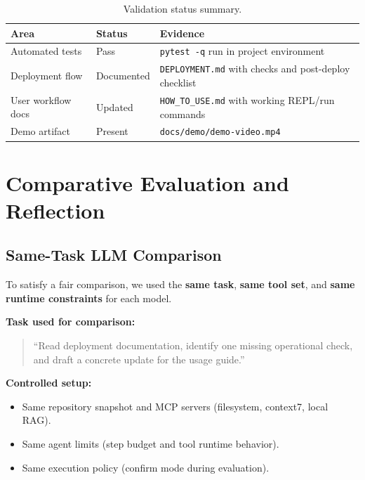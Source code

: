 \documentclass[11pt, letterpaper]{article}
\begin{document}
\begin{table}[H]
\centering\small
\begin{tabularx}{\textwidth}{@{}l l X@{}}
\toprule
\textbf{Area} & \textbf{Status} & \textbf{Evidence} \\
\midrule
Automated tests & Pass & \texttt{pytest -q} run in project environment \\
Deployment flow & Documented & \texttt{DEPLOYMENT.md} with checks and post-deploy checklist \\
User workflow docs & Updated & \texttt{HOW\_TO\_USE.md} with working REPL/run commands \\
Demo artifact & Present & \texttt{docs/demo/demo-video.mp4} \\
\bottomrule
\end{tabularx}
\caption{Validation status summary.}
\end{table}

\section{Comparative Evaluation and Reflection}

\subsection{Same-Task LLM Comparison}

To satisfy a fair comparison, we used the \textbf{same task}, \textbf{same tool set}, and
\textbf{same runtime constraints} for each model.

\textbf{Task used for comparison:}
\begin{quote}
``Read deployment documentation, identify one missing operational check, and draft a concrete update for the usage guide.''
\end{quote}

\textbf{Controlled setup:}
\begin{itemize}
    \item Same repository snapshot and MCP servers (filesystem, context7, local RAG).
    \item Same agent limits (step budget and tool runtime behavior).
    \item Same execution policy (confirm mode during evaluation).
\end{itemize}
\end{document}
